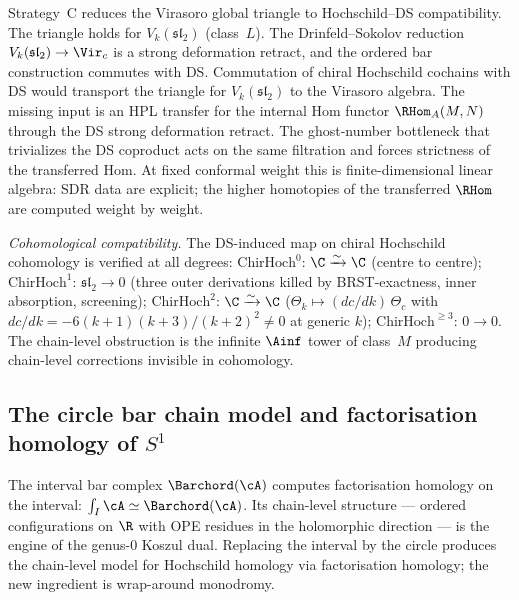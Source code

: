 \begin{remark}%
\label{rem:class-M-DS-transport-strategy}%
Strategy~C reduces the Virasoro global triangle to
Hochschild--DS compatibility.
The triangle holds for $V_k(\mathfrak{sl}_2)$ (class~$L$).
The Drinfeld--Sokolov reduction
$V_k(\mathfrak{sl}_2)\to \Vir_c$ is a strong deformation retract,
and the ordered bar construction commutes with DS.
Commutation of chiral Hochschild cochains with DS would transport the triangle
for $V_k(\mathfrak{sl}_2)$ to the Virasoro algebra.
The missing input is an HPL transfer for the internal Hom functor
$\RHom_A(M,N)$ through the DS strong deformation retract.
The ghost-number bottleneck that trivializes the DS coproduct acts on the same filtration and forces strictness of the transferred Hom.
At fixed conformal weight this is finite-dimensional linear
algebra: SDR data are explicit; the higher homotopies of the transferred $\RHom$ are computed weight by weight.

\emph{Cohomological compatibility.}
The DS-induced map on chiral Hochschild cohomology is verified at all degrees:
$\mathrm{ChirHoch}^0$: $\C \xrightarrow{\sim} \C$ (centre to centre);
$\mathrm{ChirHoch}^1$: $\mathfrak{sl}_2 \to 0$ (three outer derivations killed by BRST-exactness, inner absorption, screening);
$\mathrm{ChirHoch}^2$: $\C \xrightarrow{\sim} \C$
($\Theta_k \mapsto (dc/dk)\,\Theta_c$ with
$dc/dk = -6(k{+}1)(k{+}3)/(k{+}2)^2 \neq 0$ at generic $k$);
$\mathrm{ChirHoch}^{\ge 3}$: $0 \to 0$.
The chain-level obstruction is the infinite $\Ainf$ tower of class~$M$ producing chain-level corrections invisible in cohomology.
\end{remark}

\subsection{\texorpdfstring{The circle bar chain model and factorisation homology of $S^1$}{The circle bar chain model and factorisation homology of S1}}
\label{subsec:circle-bar-chain-model}

The interval bar complex $\Barchord(\cA)$ computes factorisation
homology on the interval: $\int_I \cA \simeq \Barchord(\cA)$.
Its chain-level structure — ordered configurations on $\R$
with OPE residues in the holomorphic direction — is the
engine of the genus-$0$ Koszul dual.
Replacing the interval by the circle produces the
chain-level model for Hochschild homology via factorisation homology; the new ingredient is wrap-around monodromy.

